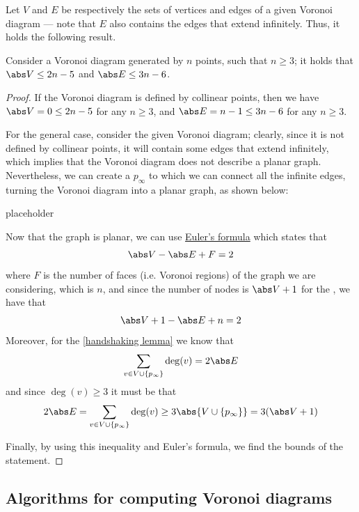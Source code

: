 \documentclass[a4paper, 12pt]{report}
\begin{document}
    Let $V$ and $E$ be respectively the sets of vertices and edges of a given Voronoi diagram --- note that $E$ also contains the edges that extend infinitely. Thus, it holds the following result.

    \begin{framedthm}{}
        Consider a Voronoi diagram generated by $n$ points, such that $n \ge 3$; it holds that $\abs V \le 2n - 5$ and $\abs E \le 3n - 6$.
    \end{framedthm}

    \begin{proof}
        If the Voronoi diagram is defined by  collinear points, then we have $\abs V = 0 \le 2n - 5$ for any $n \ge 3$, and $\abs E = n - 1 \le 3n - 6$ for any $n \ge 3$.

        For the general case, consider the given Voronoi diagram; clearly, since it is not defined by  collinear points, it will contain some edges that extend infinitely, which implies that the Voronoi diagram does not describe a planar graph. Nevertheless, we can create a  $p_\infty$ to which we can connect all the infinite edges, turning the Voronoi diagram into a planar graph, as shown below:

        placeholder 

        Now that the graph is planar, we can use \href{https://en.wikipedia.org/wiki/Planar_graph#Euler's_formula}{Euler's formula} which states that $$\abs V - \abs E + F = 2$$ where $F$ is the number of faces (i.e. Voronoi regions) of the graph we are considering, which is $n$, and since the number of nodes is $\abs V + 1$ for the , we have that $$\abs V + 1 - \abs E + n =  2$$ Moreover, for the \cref{handshaking lemma} we know that $$\sum_{v \in V \cup \{p_\infty\}}{\deg(v)} = 2 \abs E$$ and since $\deg(v) \ge 3$ it must be that $$2 \abs E = \sum_{v \in V \cup \{p_\infty\}}{\deg(v)} \ge 3 \abs{V \cup \{p_\infty\}} = 3 (\abs V + 1)$$

        Finally, by using this inequality and Euler's formula, we find the bounds of the statement.
    \end{proof}


    \subsection{Algorithms for computing Voronoi diagrams}
\end{document}
